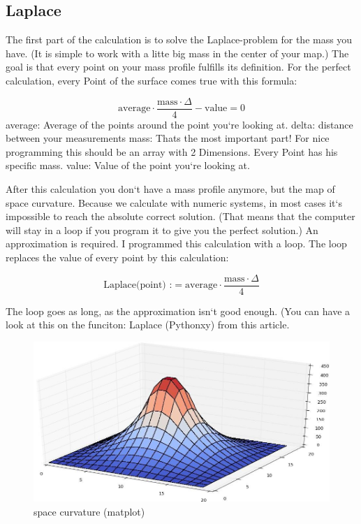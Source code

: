 \documentclass[pdftex,12pt,a4paper]{article}
\begin{document}
\subsection{Laplace}

The first part of the calculation is to solve the Laplace-problem for the mass you have. (It is simple to work with a litte big mass in the center of your map.) The goal is that every point on your mass profile fulfills its definition. For the perfect calculation, every Point of the surface comes true with this formula:


\[                                                            
	\text{average}\cdot\frac{\text{mass}\cdot\Delta}{4}- \text{value}= 0
\]
average: Average of the points around the point you`re looking at.
delta: distance between your measurements
mass: Thats the most important part! For nice programming this should be an array with 2 Dimensions. Every Point has his specific mass.
value: Value of the point you`re looking at.

After this calculation you don`t have a mass profile anymore, but the map of space curvature. Because we calculate with numeric systems, in most cases it`s impossible to reach the absolute correct solution. (That means that the computer will stay in a loop if you program it to give you the perfect solution.) An approximation is required. I programmed this calculation with a loop. The loop replaces the value of every point by this calculation:

\[                                                            
	\text{Laplace(point) :}= \text{average}\cdot\frac{\text{mass}\cdot\Delta}{4}
\]

The loop goes as long, as the approximation isn`t good enough. (You can have a look at this on the funciton: Laplace (Pythonxy) from this article.

\begin{figure}[position=h]
\centering
 \caption{space curvature (matplot)}
 \includegraphics[width=12cm]{Bilder/Laplace}%
\end{figure}
\end{document}
